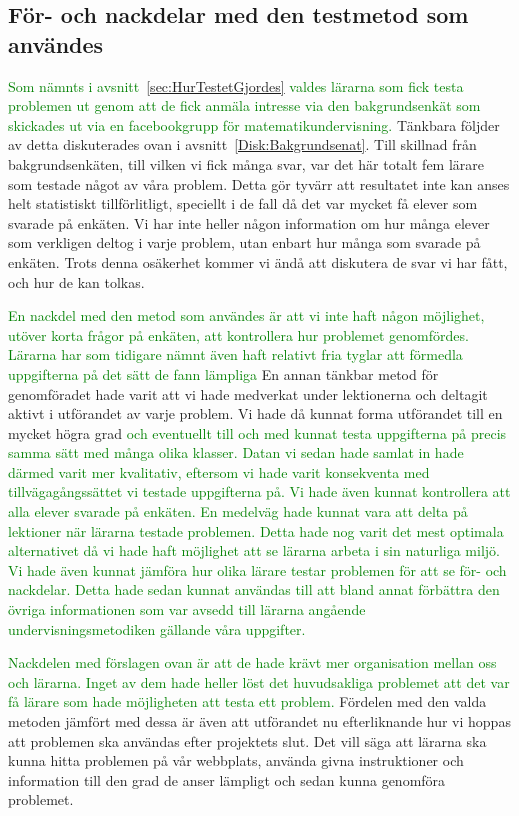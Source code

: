 \subsection{För- och nackdelar med den testmetod som användes}
    \textcolor{green}{Som nämnts i avsnitt~\ref{sec:HurTestetGjordes} valdes lärarna som fick testa problemen ut genom att de fick anmäla intresse via den bakgrundsenkät som skickades ut via en facebookgrupp för matematikundervisning.} 
    \textcolor{lila}{Tänkbara följder av detta diskuterades ovan i avsnitt~\ref{Disk:Bakgrundsenat}. Till skillnad från bakgrundsenkäten, till vilken vi fick många svar, var det här totalt fem lärare som testade något av våra problem. Detta gör tyvärr att resultatet inte kan anses helt statistiskt tillförlitligt, speciellt i de fall då det var mycket få elever som svarade på enkäten. Vi har inte heller någon information om hur många elever som verkligen deltog i varje problem, utan enbart hur många som svarade på enkäten. Trots denna osäkerhet kommer vi ändå att diskutera de svar vi har fått, och hur de kan tolkas.}
    
    
    \textcolor{green}{En nackdel med den metod som användes är att vi inte haft någon möjlighet, utöver korta frågor på enkäten, att kontrollera hur problemet genomfördes. Lärarna har som tidigare nämnt även haft relativt fria tyglar att förmedla uppgifterna på det sätt de fann lämpliga}
    \textcolor{Mahogany}{En annan tänkbar metod för genomföradet hade varit att vi hade medverkat under lektionerna och deltagit aktivt i utförandet av varje problem. Vi hade då kunnat forma utförandet till en mycket högra grad}
    \textcolor{green}{och eventuellt till och med kunnat testa uppgifterna på precis samma sätt med många olika klasser. Datan vi sedan hade samlat in hade därmed varit mer kvalitativ, eftersom vi hade varit konsekventa med tillvägagångssättet vi testade uppgifterna på. Vi hade även kunnat kontrollera att alla elever svarade på enkäten. En medelväg hade kunnat vara att delta på lektioner när lärarna testade problemen. Detta hade nog varit det mest optimala alternativet då vi hade haft möjlighet att se lärarna arbeta i sin naturliga miljö. Vi hade även kunnat jämföra hur olika lärare testar problemen för att se för- och nackdelar. Detta hade sedan kunnat användas till att bland annat förbättra den övriga informationen som var avsedd till lärarna angående undervisningsmetodiken gällande våra uppgifter.}
    
    \textcolor{green}{Nackdelen med förslagen ovan är att de hade krävt mer organisation mellan oss och lärarna. Inget av dem hade heller löst det huvudsakliga problemet att det var få lärare som hade möjligheten att testa ett problem.} 
    \textcolor{lila}{Fördelen med den valda metoden jämfört med dessa är även att utförandet nu efterliknande hur vi hoppas att problemen ska användas efter projektets slut. Det vill säga att lärarna ska kunna hitta problemen på vår webbplats, använda givna instruktioner och information till den grad de anser lämpligt och sedan kunna genomföra problemet.}